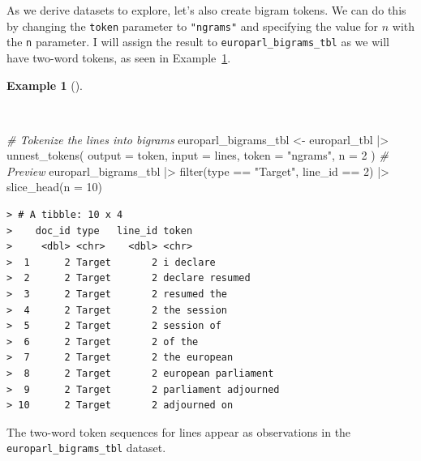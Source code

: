 \documentclass[
  letterpaper,
]{latex/krantz}
\newenvironment{Shaded}{\begin{snugshade}}{\end{snugshade}}
\newcommand{\AttributeTok}[1]{\textcolor[rgb]{0.00,0.00,0.00}{#1}}
\newcommand{\CommentTok}[1]{\textcolor[rgb]{0.00,0.00,0.00}{\textit{#1}}}
\newcommand{\DecValTok}[1]{\textcolor[rgb]{0.00,0.00,0.00}{#1}}
\newcommand{\FunctionTok}[1]{\textcolor[rgb]{0.00,0.00,0.00}{#1}}
\newcommand{\NormalTok}[1]{\textcolor[rgb]{0.00,0.00,0.00}{#1}}
\newcommand{\OtherTok}[1]{\textcolor[rgb]{0.00,0.00,0.00}{#1}}
\newcommand{\SpecialCharTok}[1]{\textcolor[rgb]{0.00,0.00,0.00}{#1}}
\newcommand{\StringTok}[1]{\textcolor[rgb]{0.00,0.00,0.00}{#1}}
\theoremstyle{definition}
\newtheorem{example}{Example}[chapter]
\theoremstyle{remark}
\begin{document}
As we derive datasets to explore, let's also create bigram tokens. We
can do this by changing the \texttt{token} parameter to
\texttt{"ngrams"} and specifying the value for \(n\) with the \texttt{n}
parameter. I will assign the result to \texttt{europarl\_bigrams\_tbl}
as we will have two-word tokens, as seen in
Example~\ref{exm-td-europarl-tokenization-bigrams-tidytext}.

\begin{example}[]\protect\hypertarget{exm-td-europarl-tokenization-bigrams-tidytext}{}\label{exm-td-europarl-tokenization-bigrams-tidytext}

~

\begin{Shaded}
\begin{Highlighting}[]
\CommentTok{\# Tokenize the lines into bigrams}
\NormalTok{europarl\_bigrams\_tbl }\OtherTok{\textless{}{-}}
\NormalTok{  europarl\_tbl }\SpecialCharTok{|\textgreater{}}
  \FunctionTok{unnest\_tokens}\NormalTok{(}
    \AttributeTok{output =}\NormalTok{ token,}
    \AttributeTok{input =}\NormalTok{ lines,}
    \AttributeTok{token =} \StringTok{"ngrams"}\NormalTok{,}
    \AttributeTok{n =} \DecValTok{2}
\NormalTok{  )}
\CommentTok{\# Preview}
\NormalTok{europarl\_bigrams\_tbl }\SpecialCharTok{|\textgreater{}}
  \FunctionTok{filter}\NormalTok{(type }\SpecialCharTok{==} \StringTok{"Target"}\NormalTok{, line\_id }\SpecialCharTok{==} \DecValTok{2}\NormalTok{) }\SpecialCharTok{|\textgreater{}}
  \FunctionTok{slice\_head}\NormalTok{(}\AttributeTok{n =} \DecValTok{10}\NormalTok{)}
\end{Highlighting}
\end{Shaded}

\begin{verbatim}
> # A tibble: 10 x 4
>    doc_id type   line_id token               
>     <dbl> <chr>    <dbl> <chr>               
>  1      2 Target       2 i declare           
>  2      2 Target       2 declare resumed     
>  3      2 Target       2 resumed the         
>  4      2 Target       2 the session         
>  5      2 Target       2 session of          
>  6      2 Target       2 of the              
>  7      2 Target       2 the european        
>  8      2 Target       2 european parliament 
>  9      2 Target       2 parliament adjourned
> 10      2 Target       2 adjourned on
\end{verbatim}

\end{example}

The two-word token sequences for lines appear as observations in the
\texttt{europarl\_bigrams\_tbl} dataset.
\end{document}
